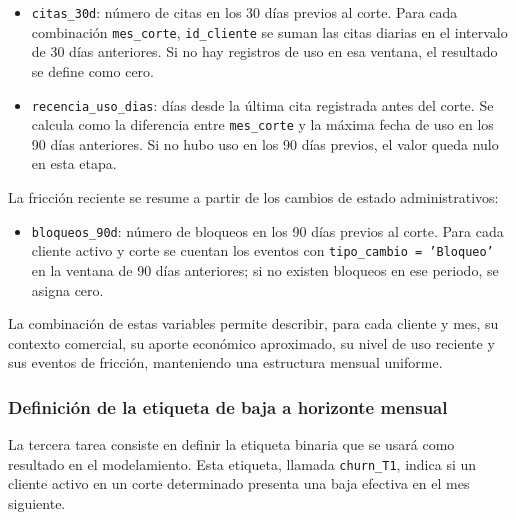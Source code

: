 \begin{itemize}
    \item \texttt{citas\_\hspace{0pt}30d}: número de citas en los 30 días previos al corte. Para cada combinación \texttt{mes\_\hspace{0pt}corte}, \texttt{id\_\hspace{0pt}cliente} se suman las citas diarias en el intervalo de 30 días anteriores. Si no hay registros de uso en esa ventana, el resultado se define como cero.
    \item \texttt{recencia\_\hspace{0pt}uso\_\hspace{0pt}dias}: días desde la última cita registrada antes del corte. Se calcula como la diferencia entre \texttt{mes\_\hspace{0pt}corte} y la máxima fecha de uso en los 90 días anteriores. Si no hubo uso en los 90 días previos, el valor queda nulo en esta etapa.
\end{itemize}

La fricción reciente se resume a partir de los cambios de estado administrativos:

\begin{itemize}
    \item \texttt{bloqueos\_\hspace{0pt}90d}: número de bloqueos en los 90 días previos al corte. Para cada cliente activo y corte se cuentan los eventos con \texttt{tipo\_\hspace{0pt}cambio = 'Bloqueo'} en la ventana de 90 días anteriores; si no existen bloqueos en ese periodo, se asigna cero.
\end{itemize}

La combinación de estas variables permite describir, para cada cliente y mes, su contexto comercial, su aporte económico aproximado, su nivel de uso reciente y sus eventos de fricción, manteniendo una estructura mensual uniforme.

\subsubsection{Definición de la etiqueta de baja a horizonte mensual}

La tercera tarea consiste en definir la etiqueta binaria que se usará como resultado en el modelamiento. Esta etiqueta, llamada \texttt{churn\_\hspace{0pt}T1}, indica si un cliente activo en un corte determinado presenta una baja efectiva en el mes siguiente.

